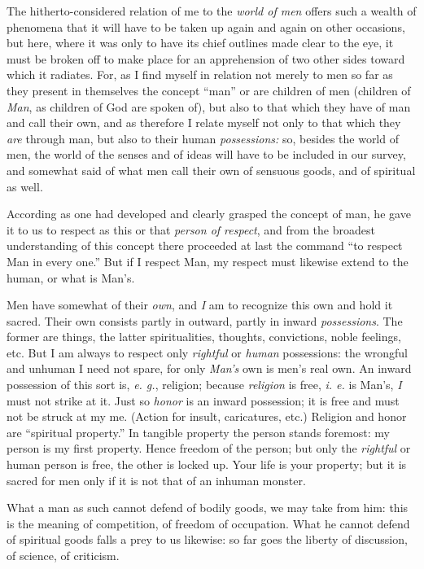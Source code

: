 \documentclass[12pt,a4paper]{book}
\begin{document}
The hitherto-considered relation of me to the \textit{world of men} offers 
such a wealth of phenomena that it will have to be taken up again and again on 
other occasions, but here, where it was only to have its chief outlines made 
clear to the eye, it must be broken off to make place for an apprehension of 
two other sides toward which it radiates. For, as I find myself in relation 
not merely to men so far as they present in themselves the concept ``man'' 
or are children of men (children of \textit{Man}, as children of God are 
spoken of), but also to that which they have of man and call their own, and as 
therefore I relate myself not only to that which they \textit{are} through 
man, but also to their human \textit{possessions:} so, besides the world of 
men, the world of the senses and of ideas will have to be included in our 
survey, and somewhat said of what men call their own of sensuous goods, and of 
spiritual as well.

According as one had developed and clearly grasped the concept of man, he gave 
it to us to respect as this or that \textit{person of respect}, and from the 
broadest understanding of this concept there proceeded at last the command 
``to respect Man in every one.'' But if I respect Man, my respect must 
likewise extend to the human, or what is Man's.

Men have somewhat of their \textit{own}, and \textit{I} am to recognize this 
own and hold it sacred. Their own consists partly in outward, partly in inward 
\textit{possessions}. The former are things, the latter spiritualities, 
thoughts, convictions, noble feelings, etc. But I am always to respect only 
\textit{rightful} or \textit{human} possessions: the wrongful and unhuman I 
need not spare, for only \textit{Man's} own is men's real own. An inward 
possession of this sort is, \textit{e. g.}, religion; because 
\textit{religion} is free, \textit{i. e.} is Man's, \textit{I} must not strike 
at it. Just so \textit{honor} is an inward possession; it is free and must not 
be struck at my me. (Action for insult, caricatures, etc.) Religion and honor 
are ``spiritual property.'' In tangible property the person stands foremost: 
my person is my first property. Hence freedom of the person; but only the 
\textit{rightful} or human person is free, the other is locked up. Your life 
is your property; but it is sacred for men only if it is not that of an 
inhuman monster.

What a man as such cannot defend of bodily goods, we may take from him: this 
is the meaning of competition, of freedom of occupation. What he cannot defend 
of spiritual goods falls a prey to us likewise: so far goes the liberty of 
discussion, of science, of criticism.
\end{document}
